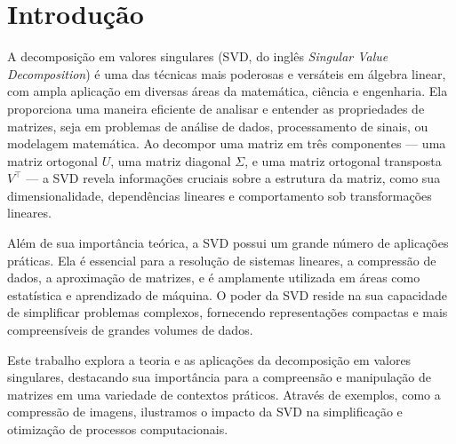 \chapter{Introdução}

A decomposição em valores singulares (SVD, do inglês \textit{Singular Value Decomposition}) é uma das técnicas mais poderosas e versáteis em álgebra linear, com ampla aplicação em diversas áreas da matemática, ciência e engenharia. Ela proporciona uma maneira eficiente de analisar e entender as propriedades de matrizes, seja em problemas de análise de dados, processamento de sinais, ou modelagem matemática. Ao decompor uma matriz em três componentes — uma matriz ortogonal \( U \), uma matriz diagonal \( \Sigma \), e uma matriz ortogonal transposta \( V^\top \) — a SVD revela informações cruciais sobre a estrutura da matriz, como sua dimensionalidade, dependências lineares e comportamento sob transformações lineares.

Além de sua importância teórica, a SVD possui um grande número de aplicações práticas. Ela é essencial para a resolução de sistemas lineares, a compressão de dados, a aproximação de matrizes, e é amplamente utilizada em áreas como estatística e aprendizado de máquina. O poder da SVD reside na sua capacidade de simplificar problemas complexos, fornecendo representações compactas e mais compreensíveis de grandes volumes de dados.

Este trabalho explora a teoria e as aplicações da decomposição em valores singulares, destacando sua importância para a compreensão e manipulação de matrizes em uma variedade de contextos práticos. Através de exemplos, como a compressão de imagens, ilustramos o impacto da SVD na simplificação e otimização de processos computacionais.
